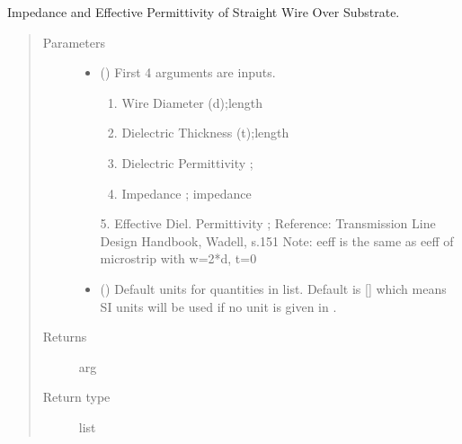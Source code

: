 \documentclass[letterpaper,10pt,english]{sphinxmanual}
\begin{document}
\begin{fulllineitems}
\label{\detokenize{components:components.Zo_eeff_WireOnGroundedSubstrate}}
Impedance and Effective Permittivity of Straight Wire Over Substrate.
\begin{quote}\begin{description}
\item[{Parameters}] \leavevmode\begin{itemize}
\item {} 
 () \textendash{} 
First 4 arguments are inputs.
\begin{enumerate}
%
\item {} 
Wire Diameter (d);length

\item {} 
Dielectric Thickness (t);length

\item {} 
Dielectric Permittivity ;

\item {} 
Impedance ; impedance

\end{enumerate}

5.  Effective Diel. Permittivity ;
Reference:  Transmission Line Design Handbook, Wadell, s.151
Note: eeff is the same as eeff of microstrip with w=2*d, t=0


\item {} 
 (\sphinxstyleliteralemphasis{\sphinxupquote{, }}) \textendash{} Default units for quantities in  list. Default is {[}{]} which means SI units will be used if no unit is given in .

\end{itemize}

\item[{Returns}] \leavevmode
arg

\item[{Return type}] \leavevmode
list

\end{description}\end{quote}

\end{fulllineitems}
\end{document}

